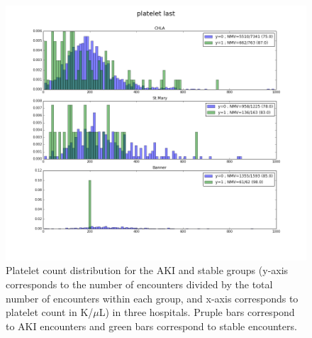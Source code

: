 \documentclass[
   technote
]{phildoc}
\begin{document}
\begin{figure}[!htbp]
\centering
\includegraphics[width=\textwidth]{./figures/platelet_last.png}
\caption{Platelet count distribution for the AKI and stable groups (y-axis corresponds to the number of encounters divided by the total number of encounters within each group, and x-axis corresponds to platelet count in K/$\mu$L) in three hospitals. Pruple bars correspond to AKI encounters and green bars correspond to stable encounters.} 
\label{fig:platelet_dist}      
\end{figure}


\end{document}
